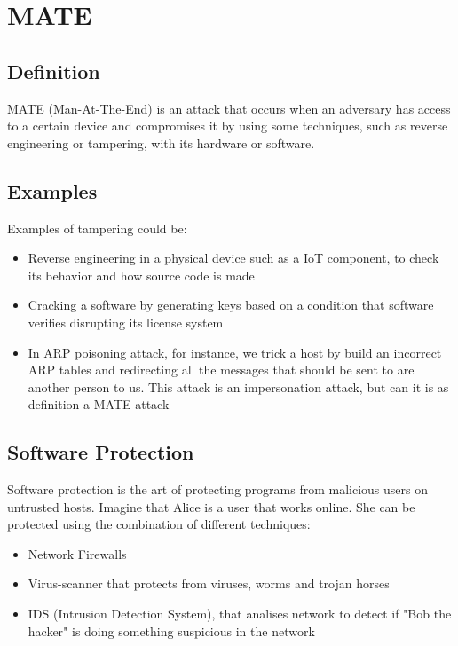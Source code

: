 \section{MATE}

\subsection{Definition}

MATE (Man-At-The-End) is an attack that occurs when an adversary has  access to a certain device and compromises it by using some techniques, such as reverse engineering or tampering, with its hardware or software. 

\subsection{Examples}

Examples of tampering could be:

\begin{itemize}
    \item Reverse engineering in a physical device such as a IoT component, to check its behavior and how source code is made
    \item Cracking a software by generating keys based on a condition that software verifies disrupting its license system
    \item In ARP poisoning attack, for instance, we trick a host by build an incorrect ARP tables and redirecting all the messages that should be sent to are another person to us. This attack is an impersonation attack, but can it is as definition a MATE attack
\end{itemize}

\subsection{Software Protection}

Software protection is the art of protecting programs from malicious users on untrusted hosts.\newline
Imagine that Alice is a user that works online.
She can be protected using the combination of different techniques: 
\begin{itemize}
    \item Network Firewalls
    \item Virus-scanner that protects from viruses, worms and trojan horses
    \item IDS (Intrusion Detection System), that analises network to detect if "Bob the hacker" is doing something suspicious in the network
\end{itemize}

